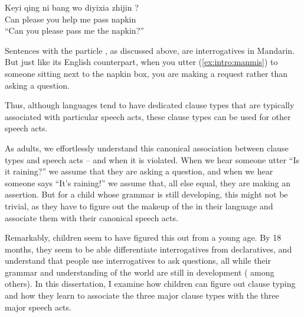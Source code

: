 \gll Keyi qing ni bang wo diyixia zhijin ?\\
Can please you help me pass napkin \Sfp{}\\
``Can you please pass me the napkin?''
\eex

Sentences with the particle , as discussed above, are interrogatives in Mandarin. But just like its English counterpart, when you utter (\ref{ex:intro:manmis}) to someone sitting next to the napkin box, you are making a request rather than asking a question. 

Thus, although languages tend to have dedicated clause types that are typically associated with particular speech acts, these clause types can be used for other speech acts. 

As adults, we effortlessly understand this canonical association between clause types and speech acts -- and when it is violated. When we hear someone utter ``Is it raining?'' we assume that they are asking a question, and when we hear someone says ``It's raining!'' we assume that, all else equal, they are making an assertion.  But for a child whose grammar is still developing, this might not be trivial, as they have to figure out the makeup of the \diis{} in their language and associate them with their canonical speech acts.   %

Remarkably, children seem to have figured this out from a young age. By 18 months, they seem to be able differentiate interrogatives from declaratives, and understand that people use interrogatives to ask questions, all while their grammar and understanding of the world are still in development (\cite{geffenmintz2011,geffenmintz2015wordorder,casillas2017turn,perkins2019,marshmallowqueen} among others). In this dissertation, I examine how children can figure out clause typing and how they learn to associate the three major clause types with the three major speech acts. %

